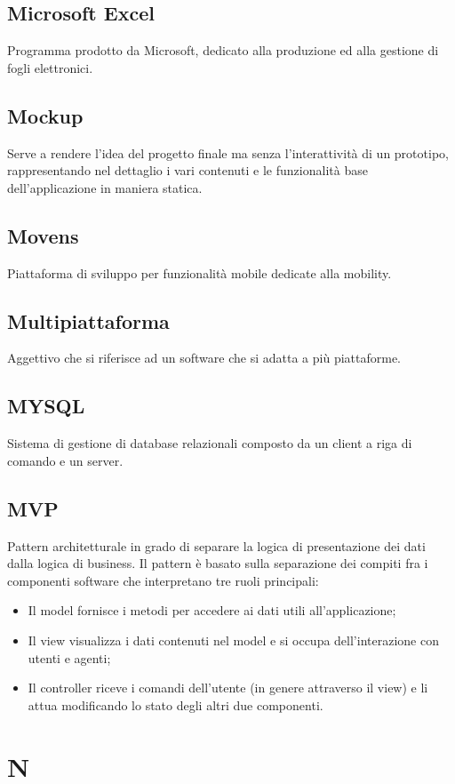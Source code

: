 \subsection*{Microsoft Excel} Programma prodotto da Microsoft, dedicato alla produzione ed alla gestione di fogli elettronici.
\subsection*{Mockup} Serve a rendere l’idea del progetto finale ma senza l’interattività di un prototipo, rappresentando nel dettaglio i vari contenuti e le funzionalità base dell’applicazione in maniera statica.
\subsection*{Movens} Piattaforma di sviluppo per funzionalità mobile dedicate alla mobility.
\subsection*{Multipiattaforma} Aggettivo che si riferisce ad un software che si adatta a più piattaforme.
\subsection*{MYSQL} Sistema di gestione di database relazionali composto da un client a riga di comando e un server.
\subsection*{MVP} 
Pattern architetturale in grado di separare la logica di presentazione dei dati dalla logica di business. Il pattern è basato sulla separazione dei compiti fra i componenti software che interpretano tre ruoli principali:
    \begin{itemize}
        \item Il model fornisce i metodi per accedere ai dati utili all'applicazione;
        \item Il view visualizza i dati contenuti nel model e si occupa dell'interazione con utenti e agenti;
        \item Il controller riceve i comandi dell'utente (in genere attraverso il view) e li attua modificando lo stato degli altri due componenti.
    \end{itemize}
    
    
    
\newpage
\section{N}
\newpage
